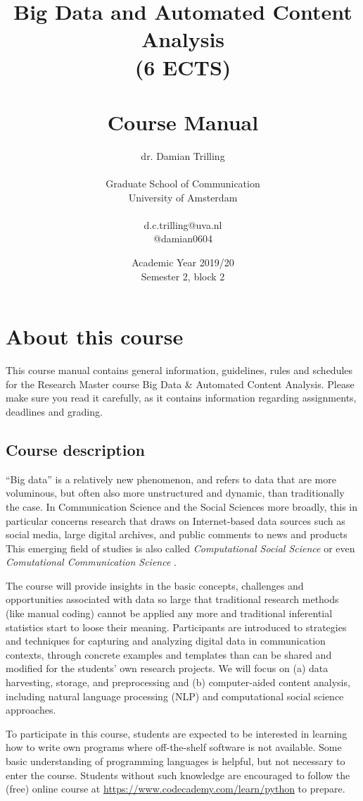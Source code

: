 \documentclass[a4paper,10pt]{report}
\title{Big Data and Automated Content Analysis\\(6 ECTS) \\~\\Course Manual}
\author{dr. Damian Trilling\\~\\Graduate School of Communication\\University of Amsterdam\\~\\d.c.trilling@uva.nl\\@damian0604}
\date{Academic Year 2019/20\\Semester 2, block 2}
\begin{document}
\maketitle



\chapter{About this course}

This course manual contains general information, guidelines, rules and schedules for the Research Master course Big Data \& Automated Content Analysis. Please make sure you read it carefully, as it  contains information regarding assignments, deadlines and grading.

\section{Course description}
 
``Big data'' is a relatively new phenomenon, and refers to data that are more voluminous, but often also more unstructured and dynamic, than traditionally the case. In Communication Science and the Social Sciences more broadly, this in particular concerns research that draws on Internet-based data sources such as social media, large digital archives, and public comments to news and products This emerging field of studies is also called \emph{Computational Social Science} \citep{Lazer2009} or even \emph{Comutational Communication Science} \citep{Shah2015}.

The course will provide insights in the basic concepts, challenges and opportunities associated with data so large that traditional research methods (like manual coding) cannot be applied any more and traditional inferential statistics start to loose their meaning. Participants are introduced to strategies and techniques for capturing and analyzing digital data in communication contexts, through concrete examples and templates than can be shared and modified for the students’ own research projects. We will focus on (a) data harvesting, storage, and preprocessing and (b) computer-aided content analysis, including natural language processing (NLP) and computational social science approaches.

To participate in this course, students are expected to be interested in learning how to write own programs where off-the-shelf software is not available. Some basic understanding of programming languages is helpful, but not necessary to enter the course. Students without such knowledge are encouraged to follow the (free) online course at \url{https://www.codecademy.com/learn/python} to prepare.
\end{document}

